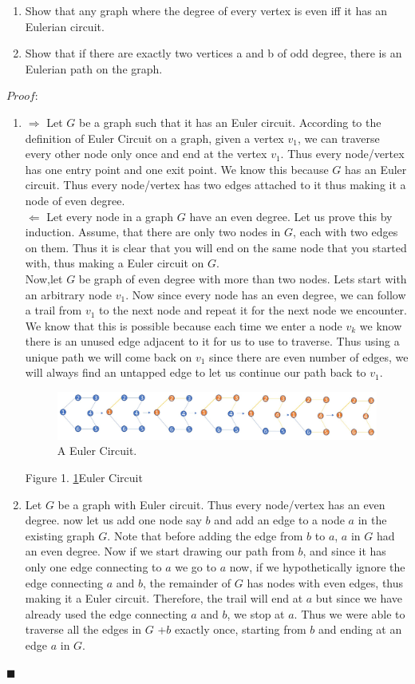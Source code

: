 \documentclass[12pt, fullpage]{article}
\newcommand*{\QEDA}{\hfill\ensuremath{\blacksquare}}%
\begin{document}
\begin{enumerate}
	\item Show that any graph where the degree of every vertex is even iff it has an Eulerian circuit.
	\item Show that if there are exactly two vertices a and b of odd degree, there is an Eulerian path on the graph.
\end{enumerate}
$Proof:$
\begin{enumerate}
	\item
 	$\Rightarrow$ Let $G$ be a graph such that it has an Euler circuit. According to the definition of Euler Circuit on a graph, given a vertex $v_1$, we can traverse every other node only once and end at the vertex $v_1$. Thus every node/vertex has one entry point and one exit point. We know this because $G$ has an Euler circuit. Thus every node/vertex has two edges attached to it thus making it a node of even degree. \\
 	$\Leftarrow$ Let every node in a graph $G$ have an even degree. Let us prove this by induction. Assume, that there are only two nodes in $G$, each with two edges on them. Thus it is clear that you will end on the same node that you started with, thus making a Euler circuit on $G$. \\
 	Now,let $G$ be  graph of even degree with more than two nodes. Lets start with an arbitrary node $v_1$. Now since every node has an even degree, we can follow a trail from $v_1$ to the next node and repeat it for the next node we encounter. We know that this is possible because each time we enter a node $v_k$ we know there is an unused edge adjacent to it for us to use to traverse. Thus using a unique path we will come back on $v_1$ since there are even number of edges, we will always find an untapped edge to let us continue our path back to $v_1$.
\begin{figure}[h!]
  \includegraphics[width=\linewidth	]{circuit.jpg}
  \caption{A Euler Circuit.}
  \label{fig:ec1}
\end{figure} 	
 	Figure 1. \ref{fig:ec1}Euler Circuit
	\item
	Let $G$ be a graph with Euler circuit. Thus every node/vertex has an even degree. now let us add one node say $b$ and add an edge to a node $a$ in the existing graph $G$. Note that before adding the edge from $b$ to $a$, $a$ in $G$ had an even degree. Now if we start drawing our path from $b$, and since it has only one edge connecting to $a$ we go to $a$ now, if we hypothetically ignore the edge connecting $a$ and $b$, the remainder of $G$ has nodes with even edges, thus making it a Euler circuit. Therefore, the trail will end at $a$ but since we have already used the edge connecting $a$ and $b$, we stop at $a$. Thus we were able to traverse all the edges in $G$ +$b$ exactly once, starting from $b$ and ending at an edge $a$ in $G$.
\end{enumerate}

\QEDA
\end{document}
